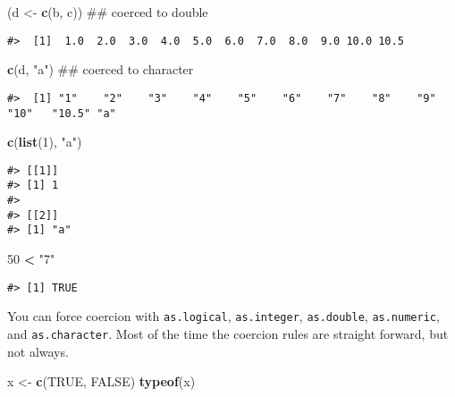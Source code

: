 \documentclass[]{book}
\newenvironment{Shaded}{\begin{snugshade}}{\end{snugshade}}
\newcommand{\KeywordTok}[1]{\textcolor[rgb]{0.13,0.29,0.53}{\textbf{#1}}}
\newcommand{\DecValTok}[1]{\textcolor[rgb]{0.00,0.00,0.81}{#1}}
\newcommand{\StringTok}[1]{\textcolor[rgb]{0.31,0.60,0.02}{#1}}
\newcommand{\OtherTok}[1]{\textcolor[rgb]{0.56,0.35,0.01}{#1}}
\newcommand{\OperatorTok}[1]{\textcolor[rgb]{0.81,0.36,0.00}{\textbf{#1}}}
\newcommand{\NormalTok}[1]{#1}
\theoremstyle{definition}
\theoremstyle{definition}
\theoremstyle{definition}
\theoremstyle{remark}
\begin{document}
\begin{Shaded}
\begin{Highlighting}[]
\NormalTok{(d <-}\StringTok{ }\KeywordTok{c}\NormalTok{(b, c))  ## coerced to double}
\end{Highlighting}
\end{Shaded}

\begin{verbatim}
#>  [1]  1.0  2.0  3.0  4.0  5.0  6.0  7.0  8.0  9.0 10.0 10.5
\end{verbatim}

\begin{Shaded}
\begin{Highlighting}[]
\KeywordTok{c}\NormalTok{(d, }\StringTok{"a"}\NormalTok{)       ## coerced to character}
\end{Highlighting}
\end{Shaded}

\begin{verbatim}
#>  [1] "1"    "2"    "3"    "4"    "5"    "6"    "7"    "8"    "9"    "10"   "10.5" "a"
\end{verbatim}

\begin{Shaded}
\begin{Highlighting}[]
\KeywordTok{c}\NormalTok{(}\KeywordTok{list}\NormalTok{(}\DecValTok{1}\NormalTok{), }\StringTok{"a"}\NormalTok{)}
\end{Highlighting}
\end{Shaded}

\begin{verbatim}
#> [[1]]
#> [1] 1
#> 
#> [[2]]
#> [1] "a"
\end{verbatim}

\begin{Shaded}
\begin{Highlighting}[]
\DecValTok{50} \OperatorTok{<}\StringTok{ "7"}
\end{Highlighting}
\end{Shaded}

\begin{verbatim}
#> [1] TRUE
\end{verbatim}

You can force coercion with \texttt{as.logical}, \texttt{as.integer},
\texttt{as.double}, \texttt{as.numeric}, and \texttt{as.character}. Most
of the time the coercion rules are straight forward, but not always.

\begin{Shaded}
\begin{Highlighting}[]
\NormalTok{x <-}\StringTok{ }\KeywordTok{c}\NormalTok{(}\OtherTok{TRUE}\NormalTok{, }\OtherTok{FALSE}\NormalTok{)}
\KeywordTok{typeof}\NormalTok{(x)}
\end{Highlighting}
\end{Shaded}
\end{document}
